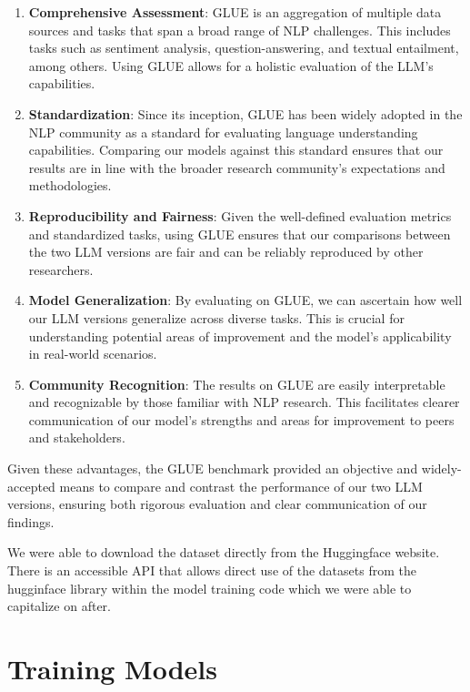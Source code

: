 \documentclass[\main/thesis.tex]{subfiles}
\begin{document}
\begin{enumerate}
    \item \textbf{Comprehensive Assessment}: GLUE is an aggregation of multiple data sources and 
    tasks that span a broad range of NLP challenges. This includes tasks such as sentiment analysis, 
    question-answering, and textual entailment, among others. Using GLUE allows for a holistic 
    evaluation of the LLM's capabilities.

    \item \textbf{Standardization}: Since its inception, GLUE has been widely adopted in the 
    NLP community as a standard for evaluating language understanding capabilities. 
    Comparing our models against this standard ensures that our results are in line with 
    the broader research community's expectations and methodologies.

    \item \textbf{Reproducibility and Fairness}: Given the well-defined evaluation metrics and 
    standardized tasks, using GLUE ensures that our comparisons between the two LLM versions are 
    fair and can be reliably reproduced by other researchers.

    \item \textbf{Model Generalization}: By evaluating on GLUE, we can ascertain how well our 
    LLM versions generalize across diverse tasks. This is crucial for understanding potential 
    areas of improvement and the model's applicability in real-world scenarios.

    \item \textbf{Community Recognition}: The results on GLUE are easily interpretable and 
    recognizable by those familiar with NLP research. This facilitates clearer communication of 
    our model's strengths and areas for improvement to peers and stakeholders.

\end{enumerate}

Given these advantages, the GLUE benchmark provided an objective and widely-accepted means 
to compare and contrast the performance of our two LLM versions, ensuring both rigorous 
evaluation and clear communication of our findings.

We were able to download the dataset directly from the Huggingface website. There is an accessible
API that allows direct use of the datasets from the hugginface library within the model 
training code which we were able to capitalize on after. 

\section{Training Models}\label{sec:ModelTraining}
\end{document}
